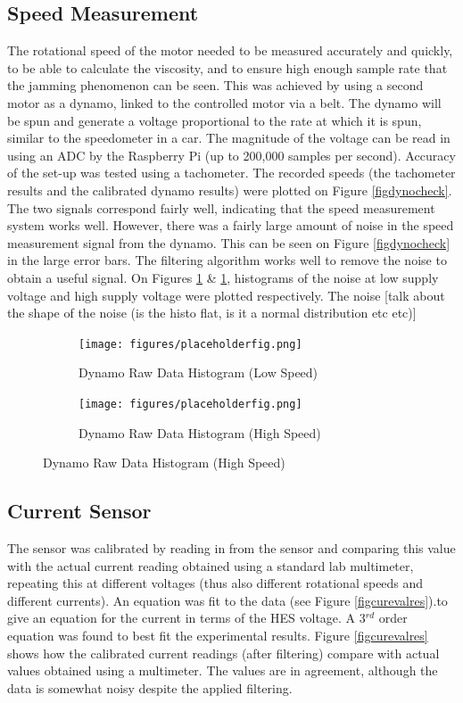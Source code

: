 \documentclass[twoside,a4]{report}
\def\br{\newline \newline \noindent}
\begin{document}
	\subsection*{Speed Measurement} %
	The rotational speed of the motor needed to be measured accurately and quickly, to be able to calculate the viscosity, and to ensure high enough sample rate that the jamming phenomenon can be seen. This was achieved by using a second motor as a dynamo, linked to the controlled motor via a belt. The dynamo will be spun and generate a voltage proportional to the rate at which it is spun, similar to the speedometer in a car. The magnitude of the voltage can be read in using an ADC by the Raspberry Pi (up to 200,000 samples per second). Accuracy of the set-up was tested using a tachometer. The recorded speeds (the tachometer results and the calibrated dynamo results) were plotted on Figure \ref{figdynocheck}. The two signals correspond fairly well, indicating that the speed measurement system works well. However, there was a fairly large amount of noise in the speed measurement signal from the dynamo. This can be seen on Figure \ref{figdynocheck} in the large error bars. The filtering algorithm works well to remove the noise to obtain a useful signal. On Figures \ref{fignoisehistolow} \& \ref{fignoisehistolow}, histograms of the noise at low supply voltage and high supply voltage were plotted respectively. The noise [talk about the shape of the noise (is the histo flat, is it a normal distribution etc etc)]\br
	\begin{figure}[!htb]
		\centering
		\begin{subfigure}{0.45\textwidth}
			\centering
			\texttt{[image: figures/placeholderfig.png]}
			\caption{Dynamo Raw Data Histogram (Low Speed)}
			\label{fignoisehistolow}
		\end{subfigure}
		\begin{subfigure}{0.45\textwidth}
			\centering
			\texttt{[image: figures/placeholderfig.png]}
			\caption{Dynamo Raw Data Histogram (High Speed)}
			\label{fignoisehistohigh}
		\end{subfigure}
	\end{figure}
	
	\subsection*{Current Sensor}
	The sensor was calibrated by reading in from the sensor and comparing this value with the actual current reading obtained using a standard lab multimeter, repeating this at different voltages (thus also different rotational speeds and different currents). An equation was fit to the data (see Figure \ref{figcurevalres}).to give an equation for the current in terms of the HES voltage. A 3$^{rd}$ order equation was found to best fit the experimental results.\br
	Figure \ref{figcurevalres} shows how the calibrated current readings (after filtering) compare with actual values obtained using a multimeter. The values are in agreement, although the data is somewhat noisy despite the applied filtering.
	
\end{document}
